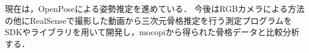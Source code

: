 \documentclass[titlepage]{jarticle}
\begin{document}
%
%
%
%

現在は，OpenPoseによる姿勢推定を進めている．
今後はRGBカメラによる方法の他にRealSenseで撮影した動画から三次元骨格推定を行う測定プログラムをSDKやライブラリを用いて開発し，mocopiから得られた骨格データと比較分析する．
%
%


%
%
%
%
%
%
%

%

%
%
%
%

%
%
\end{document}
